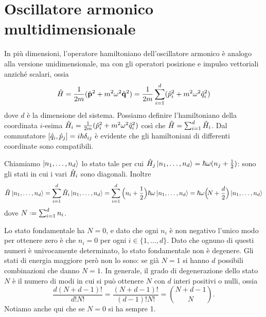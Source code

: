 \section{Oscillatore armonico multidimensionale}
In più dimensioni, l'operatore hamiltoniano dell'oscillatore armonico è analogo alla versione unidimensionale, ma con gli operatori posizione e impulso vettoriali anzich\'e scalari, ossia
\begin{equation}
	\hat{H}=\frac1{2m}(\hat{\mathbf{p}}^2+m^2\omega^2\hat{\mathbf{q}}^2)=\frac1{2m}\sum_{i=1}^d(\hat{p}_i^2+m^2\omega^2\hat{q}_i^2)
	\label{eq:hamiltoniano-oscillatore-armonico-multidim}
\end{equation}
dove $d$ è la dimensione del sistema.
Possiamo definire l'hamiltoniano della coordinata $i$-esima $\hat{H}_i=\frac1{2m}(\hat{p}_i^2+m^2\omega^2\hat{q}_i^2)$ cos\`i che $\hat{H}=\sum_{i=1}^d\hat{H}_i$.
Dal commutatore $[\hat{q}_i,\hat{p}_j]=i\hbar\delta_{ij}$ è evidente che gli hamiltoniani di differenti coordinate sono compatibili.

Chiamiamo $\left|{n_1,\dots,n_d}\right\rangle$ lo stato tale per cui $\hat{H}_j\left|{n_1,\dots,n_d}\right\rangle=\hbar\omega(n_j+\frac12)$: sono gli stati in cui i vari $\hat{H}_i$ sono diagonali.
Inoltre
\begin{equation}
	\hat{H}\left|{n_1,\dots,n_d}\right\rangle=\sum_{i=1}^d\hat{H}_i\left|{n_1,\dots,n_d}\right\rangle=\sum_{i=1}^d\Big(n_i+\frac12\Big)\hbar\omega\left|{n_1,\dots,n_d}\right\rangle=\hbar\omega\Big(\!N+\frac{d}2\Big)\left|{n_1,\dots,n_d}\right\rangle
\end{equation}
dove $N\defeq\sum_{i=1}^dn_i$.

Lo stato fondamentale ha $N=0$, e dato che ogni $n_i$ è non negativo l'unico modo per ottenere zero è che $n_i=0$ per ogni $i\in\{1,\dots,d\}$.
Dato che ognuno di questi numeri è univocamente determinato, lo stato fondamentale non è degenere.
Gli stati di energia maggiore però non lo sono: se già $N=1$ si hanno $d$ possibili combinazioni che danno $N=1$.
In generale, il grado di degenerazione dello stato $N$ è il numero di modi in cui si può ottenere $N$ con $d$ interi positivi o nulli, ossia
\begin{equation}
	\frac{d(N+d-1)!}{d!N!}=\frac{(N+d-1)!}{(d-1)!N!}=\binom{N+d-1}{N}.
\end{equation}
Notiamo anche qui che se $N=0$ si ha sempre 1.

